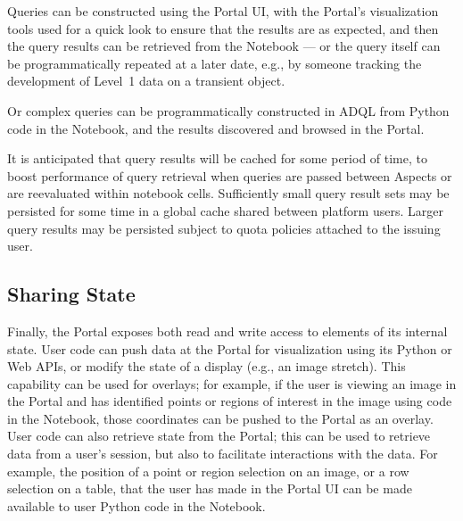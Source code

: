 Queries can be constructed using the Portal UI, with the Portal's visualization tools used for a quick look to ensure that the results are as expected, and then the query results can be retrieved from the Notebook ---
or the query itself can be programmatically repeated at a later date, e.g., by someone tracking the development of Level~1 data on a transient object.

Or complex queries can be programmatically constructed in ADQL from Python code in the Notebook, and the results discovered and browsed in the Portal.

It is anticipated that query results will be cached for some period of time, to boost performance of query retrieval when queries are passed between Aspects or are reevaluated within notebook cells.
Sufficiently small query result sets may be persisted for some time in a global cache shared between platform users.
Larger query results may be persisted subject to quota policies attached to the issuing user.

\subsection{Sharing State}\label{sharing-state}

Finally, the Portal exposes both read and write access to elements of its internal state.
User code can push data at the Portal for visualization using its Python or Web APIs, or modify the state of a display (e.g., an image stretch).
This capability can be used for overlays; for example, if the user is viewing an image in the Portal and has identified points or regions of interest in the image using code in the Notebook, those coordinates can be pushed to the Portal as an overlay.
User code can also retrieve state from the Portal; this can be used to retrieve data from a user's session, but also to facilitate interactions with the data.
For example, the position of a point or region selection on an image, or a row selection on a table, that the user has made in the Portal UI can be made available to user Python code in the Notebook.
